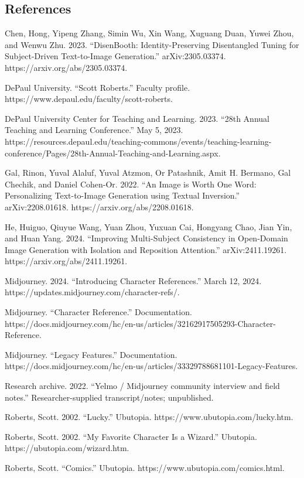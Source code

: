 \documentclass[
]{article}
\begin{document}
\subsection{References}\label{references}

Chen, Hong, Yipeng Zhang, Simin Wu, Xin Wang, Xuguang Duan, Yuwei Zhou,
and Wenwu Zhu. 2023. ``DisenBooth: Identity-Preserving Disentangled
Tuning for Subject-Driven Text-to-Image Generation.'' arXiv:2305.03374.
https://arxiv.org/abs/2305.03374.

DePaul University. ``Scott Roberts.'' Faculty profile.
https://www.depaul.edu/faculty/scott-roberts.

DePaul University Center for Teaching and Learning. 2023. ``28th Annual
Teaching and Learning Conference.'' May 5, 2023.
https://resources.depaul.edu/teaching-commons/events/teaching-learning-conference/Pages/28th-Annual-Teaching-and-Learning.aspx.

Gal, Rinon, Yuval Alaluf, Yuval Atzmon, Or Patashnik, Amit H. Bermano,
Gal Chechik, and Daniel Cohen-Or. 2022. ``An Image is Worth One Word:
Personalizing Text-to-Image Generation using Textual Inversion.''
arXiv:2208.01618. https://arxiv.org/abs/2208.01618.

He, Huiguo, Qiuyue Wang, Yuan Zhou, Yuxuan Cai, Hongyang Chao, Jian Yin,
and Huan Yang. 2024. ``Improving Multi-Subject Consistency in
Open-Domain Image Generation with Isolation and Reposition Attention.''
arXiv:2411.19261. https://arxiv.org/abs/2411.19261.

Midjourney. 2024. ``Introducing Character References.'' March 12, 2024.
https://updates.midjourney.com/character-refs/.

Midjourney. ``Character Reference.'' Documentation.
https://docs.midjourney.com/hc/en-us/articles/32162917505293-Character-Reference.

Midjourney. ``Legacy Features.'' Documentation.
https://docs.midjourney.com/hc/en-us/articles/33329788681101-Legacy-Features.

Research archive. 2022. ``Yelmo / Midjourney community interview and
field notes.'' Researcher-supplied transcript/notes; unpublished.

Roberts, Scott. 2002. ``Lucky.'' Ubutopia.
https://www.ubutopia.com/lucky.htm.

Roberts, Scott. 2002. ``My Favorite Character Is a Wizard.'' Ubutopia.
https://ubutopia.com/wizard.htm.

Roberts, Scott. ``Comics.'' Ubutopia.
https://www.ubutopia.com/comics.html.
\end{document}
